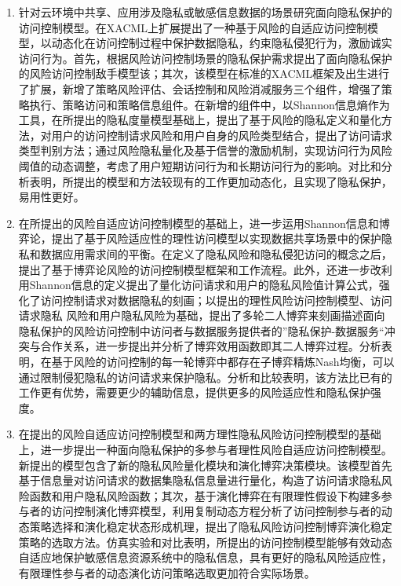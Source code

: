 \begin{enumerate}
	\item 针对云环境中共享、应用涉及隐私或敏感信息数据的场景研究面向隐私保护的访问控制模型。在XACML上扩展提出了一种基于风险的自适应访问控制模型，以动态化在访问控制过程中保护数据隐私，约束隐私侵犯行为，激励诚实访问行为。首先，根据风险访问控制场景的隐私保护需求提出了面向隐私保护的风险访问控制敌手模型该；其次，该模型在标准的XACML框架及出生进行了扩展，新增了策略风险评估、会话控制和风险消减服务三个组件，增强了策略执行、策略访问和策略信息组件。在新增的组件中，以Shannon信息熵作为工具，在所提出的隐私度量模型基础上，提出了基于风险的隐私定义和量化方法，对用户的访问控制请求风险和用户自身的风险类型结合，提出了访问请求类型判别方法；通过风险隐私量化及基于信誉的激励机制，实现访问行为风险阈值的动态调整，考虑了用户短期访问行为和长期访问行为的影响。对比和分析表明，所提出的模型和方法较现有的工作更加动态化，且实现了隐私保护，易用性更好。
	
	\item 在所提出的风险自适应访问控制模型的基础上，进一步运用Shannon信息和博弈论，提出了基于风险适应性的理性访问模型以实现数据共享场景中的保护隐私和数据应用需求间的平衡。在定义了隐私风险和隐私侵犯访问的概念之后，提出了基于博弈论风险的访问控制模型框架和工作流程。此外，还进一步改利用Shannon信息的定义提出了量化访问请求和用户的隐私风险值计算公式，强化了访问控制请求对数据隐私的刻画；以提出的理性风险访问控制模型、访问请求隐私 风险和用户隐私风险为基础，提出了多轮二人博弈来刻画描述面向隐私保护的风险访问控制中访问者与数据服务提供者的”隐私保护-数据服务“冲突与合作关系，进一步提出并分析了博弈效用函数即其二人博弈过程。分析表明，在基于风险的访问控制的每一轮博弈中都存在子博弈精炼Nash均衡，可以通过限制侵犯隐私的访问请求来保护隐私。分析和比较表明，该方法比已有的工作更有优势，需要更少的辅助信息，提供更多的风险适应性和隐私保护强度。
	
	\item 在提出的风险自适应访问控制模型和两方理性隐私风险访问控制模型的基础上，进一步提出一种面向隐私保护的多参与者理性风险自适应访问控制模型。新提出的模型包含了新的隐私风险量化模块和演化博弈决策模块。该模型首先基于信息量对访问请求的数据集隐私信息量进行量化，构造了访问请求隐私风险函数和用户隐私风险函数；其次，基于演化博弈在有限理性假设下构建多参与者的访问控制演化博弈模型，利用复制动态方程分析了访问控制参与者的动态策略选择和演化稳定状态形成机理，提出了隐私风险访问控制博弈演化稳定策略的选取方法。仿真实验和对比表明，所提出的访问控制模型能够有效动态自适应地保护敏感信息资源系统中的隐私信息，具有更好的隐私风险适应性，有限理性参与者的动态演化访问策略选取更加符合实际场景。
	
\end{enumerate}

